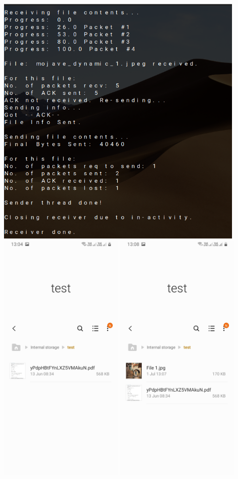 \documentclass{article}
\begin{document}
\includegraphics[height=350pt]{Output4}
\includegraphics[height=350pt]{Output5}
\includegraphics[height=350pt]{Output6}
\end{document}
